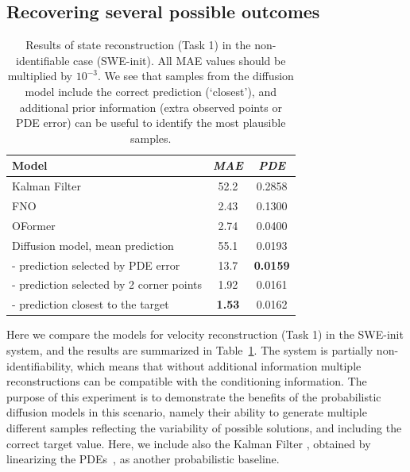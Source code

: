 \documentclass{article}
\begin{document}
\subsection{Recovering several possible outcomes}


\begin{table}[t]
\caption{
Results of state reconstruction (Task 1) in the non-identifiable case (SWE-init). All MAE values should be multiplied by $10^{-3}$. We see that samples from the diffusion model include the correct prediction (`closest'), and additional prior information (extra observed points or PDE error) can be useful to identify the most plausible samples.
}
\label{tab:res_unidentifiable}
\begin{center}
\begin{tabular}{@{}l|cc}
\hspace{2cm} Model                                          & \textit{MAE} & \textit{PDE}  
\\
\hline
Kalman Filter~\cite{kalman1960new}                          & 52.2 & 0.2858 \\
FNO~\cite{li2021fourier}                                    & 2.43 & 0.1300 \\
OFormer~\cite{li2023transformer}                            & 2.74 & 0.0400 \\
\hline
Diffusion model, mean prediction                            & 55.1 & 0.0193 \\
 \hspace{0.2cm} - prediction selected by PDE error          & 13.7 & \textbf{0.0159} \\
 \hspace{0.2cm} - prediction selected by 2 corner points    & 1.92 &  0.0161 \\
 \hspace{0.2cm} - prediction closest to the target          & \textbf{1.53} & 0.0162 \\
\end{tabular}
\end{center}
\end{table}


Here we compare the models for velocity reconstruction (Task 1) in the SWE-init system, and the results are summarized in Table~\ref{tab:res_unidentifiable}. The system is partially non-identifiability, which means that without additional information multiple reconstructions can be compatible with the conditioning information. The purpose of this experiment is to demonstrate the benefits of the probabilistic diffusion models in this scenario, namely their ability to generate multiple different samples reflecting the variability of possible solutions, and including the correct target value. Here, we include also the Kalman Filter \cite{kalman1960new}, obtained by linearizing the PDEs~\cite{rafiee2009kalman}, as another probabilistic baseline.
\end{document}
